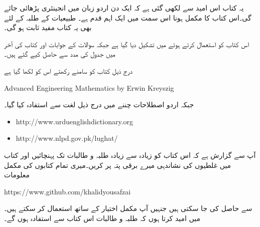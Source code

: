 یہ کتاب اس امید سے لکھی گئی ہے کہ ایک دن اردو زبان میں انجینئری پڑھائی جائے گی۔اس کتاب کا مکمل ہونا اس سمت میں ایک اہم قدم ہے۔ طبیعیات کے طلبہ کے لئے بھی یہ کتاب مفید ثابت ہو گی۔

اس کتاب کو  استعمال کرتے ہوئے  میں تشکیل دیا گیا ہے جبکہ سوالات کے جوابات   اور کتاب کی آخر میں جدول  کی مدد سے حاصل کیے گئے ہیں۔ 

درج ذیل کتاب کو سامنے رکھتے اس کو لکھا گیا ہے

{
\begin{otherlanguage}{english}
Advanced Engineering Mathematics by Erwin Kreyszig
\end{otherlanguage}
}

جبکہ اردو اصطلاحات چننے میں درج ذیل لغت سے استفادہ  کیا گیا۔
{
\begin{otherlanguage}{english}
\begin{itemize}
\item
http:/\!\!/www.urduenglishdictionary.org
\item
http:/\!\!/www.nlpd.gov.pk/lughat/
\end{itemize}
\end{otherlanguage}
}
آپ سے گزارش ہے کہ اس کتاب کو زیادہ سے زیادہ طلبہ و طالبات تک پہنچائیں اور کتاب میں غلطیوں کی نشاندہی میرے  برقی پتہ پر کریں۔میری تمام کتابوں کی مکمل  معلومات

{
\begin{otherlanguage}{english}
https:/\!\!/www.github.com/khalidyousafzai
\end{otherlanguage}
}

سے حاصل کی جا سکتی ہیں جنہیں آپ مکمل اختیار کے ساتھ استعمال کر سکتے ہیں۔میں امید کرتا ہوں کہ طلبہ و طالبات اس کتاب سے استفادہ ہوں گے۔
\vspace{5mm}

{}


